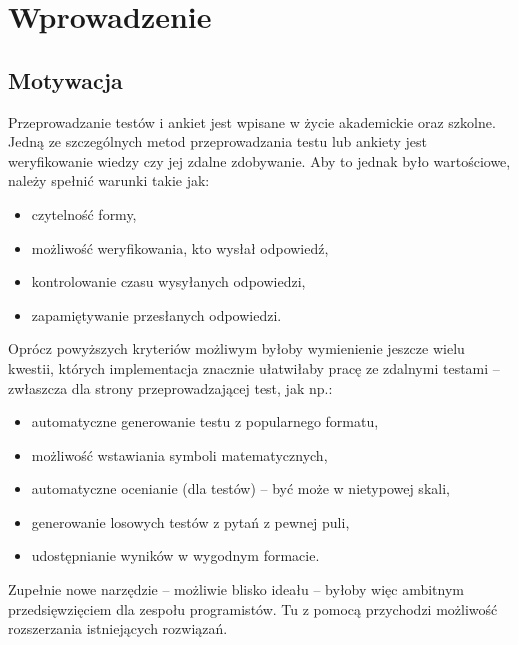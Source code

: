 \chapter{Wprowadzenie}%
\section{Motywacja}
Przeprowadzanie testów i ankiet jest wpisane w życie akademickie oraz szkolne. Jedną ze szczególnych metod przeprowadzania testu lub ankiety jest weryfikowanie wiedzy czy jej zdalne zdobywanie.
Aby to jednak było wartościowe, należy spełnić warunki takie jak:
\begin{itemize}
\item czytelność formy,
\item możliwość weryfikowania, kto wysłał odpowiedź,
\item kontrolowanie czasu wysyłanych odpowiedzi,
\item zapamiętywanie przesłanych odpowiedzi.
\end{itemize}
Oprócz powyższych kryteriów możliwym byłoby wymienienie jeszcze wielu kwestii, których implementacja znacznie ułatwiłaby pracę ze zdalnymi testami -- zwłaszcza dla strony przeprowadzającej test, jak np.:
\begin{itemize}
\item automatyczne generowanie testu z popularnego formatu,
\item możliwość wstawiania symboli matematycznych,
\item automatyczne ocenianie (dla testów)  -- być może w nietypowej skali,
\item generowanie losowych testów z pytań z pewnej puli,
\item udostępnianie wyników w wygodnym formacie.
\end{itemize}
Zupełnie nowe narzędzie -- możliwie blisko ideału -- byłoby więc ambitnym przedsięwzięciem dla zespołu programistów. Tu z pomocą przychodzi możliwość rozszerzania istniejących rozwiązań.

